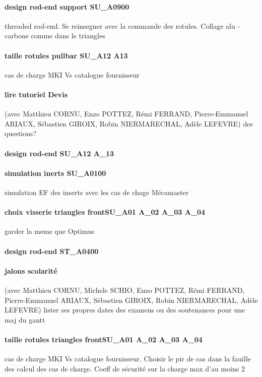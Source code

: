 \paragraph{design rod-end support SU\_A0900} threaded rod-end. Se reinsegner avec la commande des rotules. Collage alu - carbone comme dans le triangles
\paragraph{taille rotules pullbar SU\_A12 A13} cas de charge MKI Vs catalogue fournisseur
\paragraph{lire tutoriel Devis} (avec Matthieu CORNU, Enzo POTTEZ, Rémi FERRAND, Pierre-Emmanuel ARIAUX, Sébastien GIROIX, Robin NIERMARECHAL, Adèle LEFEVRE) des questions?
\paragraph{design rod-end SU\_A12 A\_13} 
\paragraph{simulation inerts SU\_A0100} simulation EF des inserts avec les cas de chage Mécamaster
\paragraph{choix visserie triangles frontSU\_A01 A\_02 A\_03 A\_04} garder la meme que Optimus
\paragraph{design rod-end ST\_A0400} 
\paragraph{jalons scolarité} (avec Matthieu CORNU, Michele SCHIO, Enzo POTTEZ, Rémi FERRAND, Pierre-Emmanuel ARIAUX, Sébastien GIROIX, Robin NIERMARECHAL, Adèle LEFEVRE) lister ses propres dates des examens ou des soutenances pour une maj du gantt
\paragraph{taille rotules triangles frontSU\_A01 A\_02 A\_03 A\_04} cas de charge MKI Vs catalogue fournisseur. Choisir le pir de cas dans la fauille des calcul des cas de charge. Coeff de sécurité sur la charge max d'au moins 2
